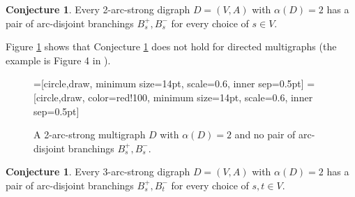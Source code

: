 \documentclass{article}
\theoremstyle{definition}
\newtheorem{conjecture}[theorem]{Conjecture}
\newcommand{\2}{\vspace{0.2cm}}
\begin{document}
\begin{conjecture}\label{conj:2asalpha2}
  Every 2-arc-strong digraph $D=(V,A)$ with $\alpha{}(D)=2$ has a pair of arc-disjoint branchings
  $B_s^+,B_s^-$ for every choice of $s\in V$.
\end{conjecture}

Figure \ref{fig:badmulti} shows that Conjecture \ref{conj:2asalpha2} does not hold for directed multigraphs (the example is Figure 4 in \cite{bangDM309}).

\begin{figure}[H]
\begin{center}
=[circle,draw, minimum size=14pt, scale=0.6, inner sep=0.5pt]
=[circle,draw, color=red!100, minimum size=14pt, scale=0.6, inner sep=0.5pt]

\end{center}
\caption{A 2-arc-strong multigraph $D$ with $\alpha{}(D)=2$ and no pair of arc-disjoint branchings $B_s^+,B_s^-$.}\label{fig:badmulti}
\end{figure}



\begin{conjecture}
  Every 3-arc-strong digraph $D=(V,A)$ with $\alpha{}(D)=2$ has a pair of arc-disjoint branchings
  $B_s^+,B_t^-$ for every choice of $s,t\in V$.
\end{conjecture}

\end{document}
